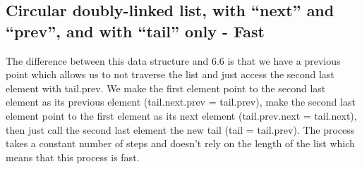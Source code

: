 \documentclass{article}
\begin{document}
\subsection{Circular doubly-linked list, with “next” and “prev”, and with “tail” only - Fast}
The difference between this data structure and 6.6 is that we have a previous point which allows us to not traverse the list and just access the second last element with tail.prev. We make the first element point to the second last element as its previous element (tail.next.prev = tail.prev), make the second last element point to the first element as its next element (tail.prev.next = tail.next), then just call the second last element the new tail (tail = tail.prev). The process takes a constant number of steps and doesn't rely on the length of the list which means that this process is fast.
\end{document}
